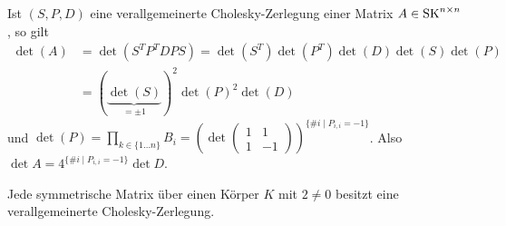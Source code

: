 \documentclass[../../main.tex]{subfiles}
\begin{document}
\begin{bem}\label{13.5.8}
Ist $(S,P,D)$ eine verallgemeinerte Cholesky-Zerlegung einer Matrix $A\in \operatorname{SK}^{n\times n}$, so gilt
\begin{align*}
\det(A)&=\det(S^TP^TDPS)=\det(S^T)\det(P^T)\det(D)\det(S)\det(P)\\
&=(\underbrace{\det(S)}_{=\pm 1})^2\det(P)^2\det(D)
\end{align*}
und $\det (P)=\prod_{k\in \{1\ldots n\}} B_i=\left(\det\begin{pmatrix*}1&1\\ 1 &-1\end{pmatrix*}\right)^{\{\# i\mid P_{i,i}=-1\}}$. Also $\det A=4^{\{\# i\mid P_{i,i}=-1\}}\det D$.
\end{bem}

\begin{sat}\label{13.5.9} 
Jede symmetrische Matrix über einen Körper $K$ mit $2\neq 0$ besitzt eine verallgemeinerte Cholesky-Zerlegung.
\end{sat}
\end{document}
